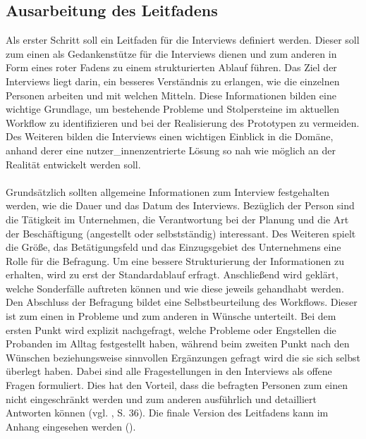 \documentclass[Bachelorarbeit.tex]{subfiles}
\begin{document}
\subsection{Ausarbeitung des Leitfadens}

Als erster Schritt soll ein Leitfaden für die Interviews definiert werden. 
Dieser soll zum einen als Gedankenstütze für die Interviews dienen und zum anderen in Form eines roter Fadens zu einem strukturierten Ablauf führen.
Das Ziel der Interviews liegt darin, ein besseres Verständnis zu erlangen, wie die einzelnen Personen arbeiten und mit welchen Mitteln.
Diese Informationen bilden eine wichtige Grundlage, um bestehende Probleme und Stolpersteine im aktuellen Workflow zu identifizieren und bei der Realisierung des Prototypen zu vermeiden. 
Des Weiteren bilden die Interviews einen wichtigen Einblick in die Domäne, anhand derer eine nutzer\_innenzentrierte Lösung so nah wie möglich an der Realität entwickelt werden soll.\\
\\
Grundsätzlich sollten allgemeine Informationen zum Interview festgehalten werden, wie die Dauer und das Datum des Interviews.
Bezüglich der Person sind die Tätigkeit im Unternehmen, die Verantwortung bei der Planung und die Art der Beschäftigung (angestellt oder selbstständig) interessant.
Des Weiteren spielt die Größe, das Betätigungsfeld und das Einzugsgebiet des Unternehmens eine Rolle für die Befragung.
Um eine bessere Strukturierung der Informationen zu erhalten, wird zu erst der Standardablauf erfragt. 
Anschließend wird geklärt, welche Sonderfälle auftreten können und wie diese jeweils gehandhabt werden.
Den Abschluss der Befragung bildet eine Selbstbeurteilung des Workflows. 
Dieser ist zum einen in Probleme und zum anderen in Wünsche unterteilt.
Bei dem ersten Punkt wird explizit nachgefragt, welche Probleme oder Engstellen die Probanden im Alltag festgestellt haben, während beim zweiten Punkt nach den Wünschen beziehungsweise sinnvollen Ergänzungen gefragt wird die sie sich selbst überlegt haben. 
Dabei sind alle Fragestellungen in den Interviews als offene Fragen formuliert. 
Dies hat den Vorteil, dass die befragten Personen zum einen nicht eingeschränkt werden und zum anderen ausführlich und detailliert Antworten können (vgl. \cite{Mayer2006}, S. 36).
Die finale Version des Leitfadens kann im Anhang eingesehen werden (). 
\end{document}
